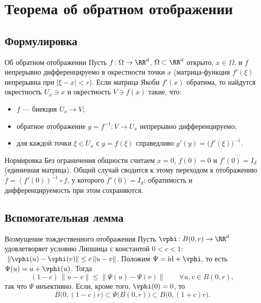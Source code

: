 
\section{Теорема об обратном отображении}

\subsection*{Формулировка}

\begin{Theorem}[required]{Об обратном отображении}{}
	Пусть $f\colon\Omega\to\RR^d$, $\Omega\subset\RR^d$ открыто, $x\in\Omega$,
	и $f$ непрерывно дифференцируемо в окрестности точки $x$ (матрица-функция
	$f'(\xi)$ непрерывна при $|\xi-x|<r$). Если матрица Якоби $f'(x)$ обратима, то
	найдутся окрестность $U_x\ni x$ и окрестность $V\ni f(x)$ такие, что:
	\begin{itemize}
		\item $f$ --- биекция $U_x\to V$;
		\item обратное отображение $g=f^{-1}\colon V\to U_x$ непрерывно дифференцируемо;
		\item для каждой точки $\xi\in U_x$ с $y=f(\xi)$ справедливо
		$g'(y)=\bigl(f'(\xi)\bigr)^{-1}$.
	\end{itemize}
\end{Theorem}

\begin{Remark}{Нормировка}{}
	Без ограничения общности считаем $x=0$, $f(0)=0$ и $f'(0)=I_d$ (единичная
	матрица). Общий случай сводится к этому переходом к отображению
	$\tilde f=(f'(0))^{-1}\circ f$, у которого $\tilde f'(0)=I_d$; обратимость и
	дифференцируемость при этом сохраняются.
\end{Remark}

\subsection*{Вспомогательная лемма}

\begin{Lemma}{Возмущение тождественного отображения}{}
	Пусть $\vphi\colon B(0,r)\to\RR^d$ удовлетворяет условию Липшица с константой
	$0<c<1$: $\ \|\vphi(u)-\vphi(v)\|\le c\,\|u-v\|$. Положим $\Psi=\mathrm{id}+\vphi$,
	то есть $\Psi(u)=u+\vphi(u)$. Тогда
	\[
	(1-c)\,\|u-v\|\le\|\Psi(u)-\Psi(v)\|\qquad\forall u,v\in B(0,r),
	\]
	так что $\Psi$ инъективно. Если, кроме того, $\vphi(0)=0$, то
	\[
	B\bigl(0,(1-c)r\bigr)\subset\Psi\bigl(B(0,r)\bigr)\subset B\bigl(0,(1+c)r\bigr).
	\]
\end{Lemma}

